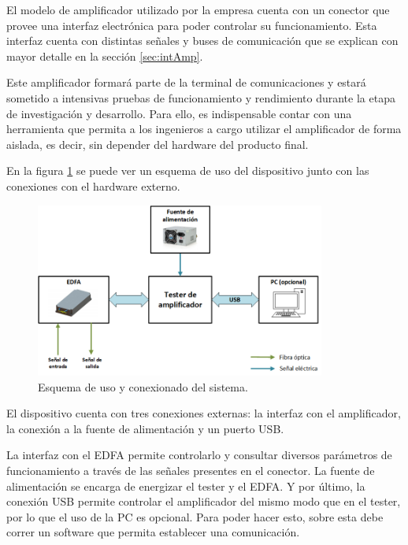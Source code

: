 El modelo de amplificador utilizado por la empresa cuenta con un conector que provee una interfaz electrónica para poder controlar su funcionamiento. Esta interfaz cuenta con distintas señales y buses de comunicación que se explican con mayor detalle en la sección \ref{sec:intAmp}.

Este amplificador formará parte de la terminal de comunicaciones y estará sometido a intensivas pruebas de funcionamiento y rendimiento durante la etapa de investigación y desarrollo. Para ello, es indispensable contar con una herramienta que permita a los ingenieros a cargo utilizar el amplificador de forma aislada, es decir, sin depender del hardware del producto final.

En la figura \ref{fig:bloquesProy} se puede ver un esquema de uso del dispositivo junto con las conexiones con el hardware externo.

\begin{figure}[H]
\centering
\includegraphics[width=0.85\textwidth]{./Figures/bloquesProy.png}
\caption{Esquema de uso y conexionado del sistema.}
\label{fig:bloquesProy}
\end{figure}

El dispositivo cuenta con tres conexiones externas: la interfaz con el amplificador, la conexión a la fuente de alimentación y un puerto USB.

La interfaz con el EDFA permite controlarlo y consultar diversos parámetros de funcionamiento a través de las señales presentes en el conector. La fuente de alimentación se encarga de energizar el tester y el EDFA. Y por último, la conexión USB permite controlar el amplificador del mismo modo que en el tester, por lo que el uso de la PC es opcional. Para poder hacer esto, sobre esta debe correr un software que permita establecer una comunicación.


